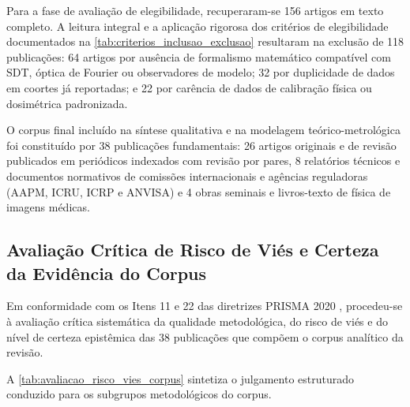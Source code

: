 \documentclass[
  12pt,
  a4paper,
  oneside
]{report}
\begin{document}
Para a fase de avaliação de elegibilidade, recuperaram-se 156 artigos em texto completo. A leitura integral e a aplicação rigorosa dos critérios de elegibilidade documentados na \cref{tab:criterios_inclusao_exclusao} resultaram na exclusão de 118 publicações: 64 artigos por ausência de formalismo matemático compatível com SDT, óptica de Fourier ou observadores de modelo; 32 por duplicidade de dados em coortes já reportadas; e 22 por carência de dados de calibração física ou dosimétrica padronizada.

O corpus final incluído na síntese qualitativa e na modelagem teórico-metrológica foi constituído por 38 publicações fundamentais: 26 artigos originais e de revisão publicados em periódicos indexados com revisão por pares, 8 relatórios técnicos e documentos normativos de comissões internacionais e agências reguladoras (AAPM, ICRU, ICRP e ANVISA) e 4 obras seminais e livros-texto de física de imagens médicas.

\subsection{Avaliação Crítica de Risco de Viés e Certeza da Evidência do Corpus}
\label{subsec:avaliacao_qualidade_risco_vies_resultados}

Em conformidade com os Itens 11 e 22 das diretrizes PRISMA 2020 \cite{page2021}, procedeu-se à avaliação crítica sistemática da qualidade metodológica, do risco de viés e do nível de certeza epistêmica das 38 publicações que compõem o corpus analítico da revisão. 

A \cref{tab:avaliacao_risco_vies_corpus} sintetiza o julgamento estruturado conduzido para os subgrupos metodológicos do corpus.
\end{document}
